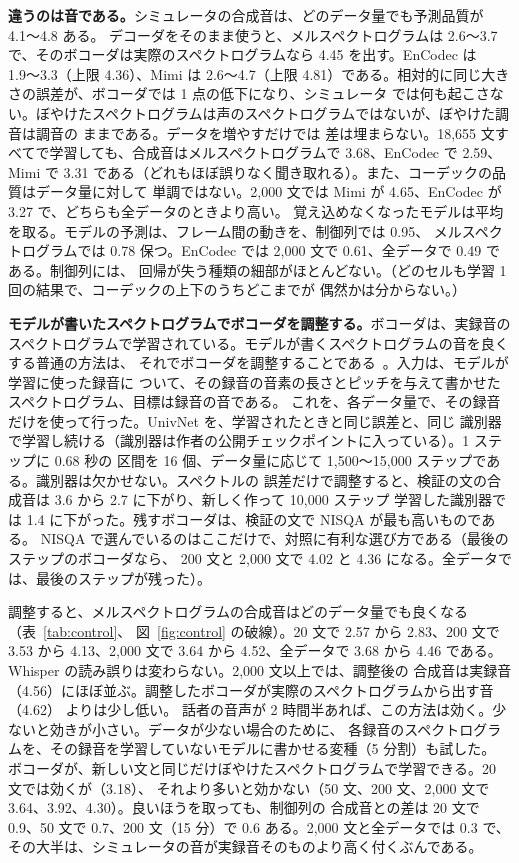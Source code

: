\documentclass[10pt,a4paper,twocolumn]{article}
\begin{document}
\textbf{違うのは音である。}シミュレータの合成音は、どのデータ量でも予測品質が 4.1〜4.8 ある。
デコーダをそのまま使うと、メルスペクトログラムは 2.6〜3.7 で、そのボコーダは実際のスペクトログラムなら 4.45 を出す。EnCodec は
1.9〜3.3（上限 4.36）、Mimi は 2.6〜4.7（上限 4.81）である。相対的に同じ大きさの誤差が、ボコーダでは 1 点の低下になり、シミュレータ
では何も起こさない。ぼやけたスペクトログラムは声のスペクトログラムではないが、ぼやけた調音は調音の
ままである。データを増やすだけでは
差は埋まらない。18,655 文すべてで学習しても、合成音はメルスペクトログラムで 3.68、EnCodec で 2.59、
Mimi で 3.31 である（どれもほぼ誤りなく聞き取れる）。また、コーデックの品質はデータ量に対して
単調ではない。2,000 文では Mimi が 4.65、EnCodec が 3.27 で、どちらも全データのときより高い。
覚え込めなくなったモデルは平均を取る。モデルの予測は、フレーム間の動きを、制御列では 0.95、
メルスペクトログラムでは 0.78 保つ。EnCodec では 2,000 文で 0.61、全データで 0.49 である。制御列には、
回帰が失う種類の細部がほとんどない。（どのセルも学習 1 回の結果で、コーデックの上下のうちどこまでが
偶然かは分からない。）

\textbf{モデルが書いたスペクトログラムでボコーダを調整する。}ボコーダは、実録音の
スペクトログラムで学習されている。モデルが書くスペクトログラムの音を良くする普通の方法は、
それでボコーダを調整することである~\cite{tacotron2,hifigan}。入力は、モデルが学習に使った録音に
ついて、その録音の音素の長さとピッチを与えて書かせたスペクトログラム、目標は録音の音である。
これを、各データ量で、その録音だけを使って行った。UnivNet を、学習されたときと同じ誤差と、同じ
識別器で学習し続ける（識別器は作者の公開チェックポイントに入っている）。1 ステップに 0.68 秒の
区間を 16 個、データ量に応じて 1,500〜15,000 ステップである。識別器は欠かせない。スペクトルの
誤差だけで調整すると、検証の文の合成音は 3.6 から 2.7 に下がり、新しく作って 10,000 ステップ
学習した識別器では 1.4 に下がった。残すボコーダは、検証の文で NISQA が最も高いものである。
NISQA で選んでいるのはここだけで、対照に有利な選び方である（最後のステップのボコーダなら、
200 文と 2,000 文で 4.02 と 4.36 になる。全データでは、最後のステップが残った）。

調整すると、メルスペクトログラムの合成音はどのデータ量でも良くなる（表~\ref{tab:control}、
図~\ref{fig:control} の破線）。20 文で 2.57 から 2.83、200 文で 3.53 から 4.13、2,000 文で 3.64 から
4.52、全データで 3.68 から 4.46 である。Whisper の読み誤りは変わらない。2,000 文以上では、調整後の
合成音は実録音（4.56）にほぼ並ぶ。調整したボコーダが実際のスペクトログラムから出す音（4.62）
よりは少し低い。
話者の音声が 2 時間半あれば、この方法は効く。少ないと効きが小さい。データが少ない場合のために、
各録音のスペクトログラムを、その録音を学習していないモデルに書かせる変種（5 分割）も試した。
ボコーダが、新しい文と同じだけぼやけたスペクトログラムで学習できる。20 文では効くが（3.18）、
それより多いと効かない（50 文、200 文、2,000 文で 3.64、3.92、4.30）。良いほうを取っても、制御列の
合成音との差は 20 文で 0.9、50 文で 0.7、200 文（15 分）で 0.6 ある。2,000 文と全データでは
0.3 で、その大半は、シミュレータの音が実録音そのものより高く付くぶんである。
\end{document}
